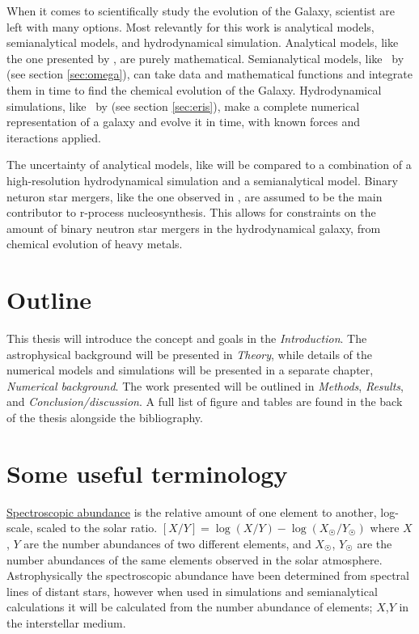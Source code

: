 When it comes to scientifically study the evolution of the Galaxy, scientist are left with many options.
Most relevantly for this work is analytical models, semianalytical models, and hydrodynamical simulation.
Analytical models, like the one presented by , are purely mathematical.
Semianalytical models, like \omegamodel\ by  (see section \ref{sec:omega}), can take data and mathematical functions and integrate them in time to find the chemical evolution of the Galaxy.
Hydrodynamical simulations, like \eris\ by  (see section \ref{sec:eris}), make a complete numerical representation of a galaxy and evolve it in time, with known forces and iteractions applied.

The uncertainty of analytical models, like  will be compared to a combination of a high-resolution hydrodynamical simulation and a semianalytical model.
Binary neturon star mergers, like the one observed in , are assumed to be the main contributor to r-process nucleosynthesis.
This allows for constraints on the amount of binary neutron star mergers in the hydrodynamical galaxy, from chemical evolution of heavy metals.

\section{Outline}
This thesis will introduce the concept and goals in the \textit{Introduction}.
The astrophysical background will be presented in \textit{Theory}, while details of the numerical models and simulations will be presented in a separate chapter, \textit{Numerical background}.
The work presented will be outlined in \textit{Methods}, \textit{Results}, and \textit{Conclusion/discussion}.
A full list of figure and tables are found in the back of the thesis alongside the bibliography.

\section{Some useful terminology}
\underline{Spectroscopic abundance} is the relative amount of one element to another, log-scale, scaled to the solar ratio.
$[X/Y] = \log\left(X / Y\right) - \log\left( X_{\astrosun}/Y_{\astrosun}\right)$
where $X$, $Y$ are the number abundances of two different elements, and $X_{\astrosun}$, $Y_{\astrosun}$ are the number abundances of the same elements observed in the solar atmosphere.
Astrophysically the spectroscopic abundance have been determined from spectral lines of distant stars, however when used in simulations and semianalytical calculations it will be calculated from the number abundance of elements; $X$,$Y$ in the interstellar medium.

